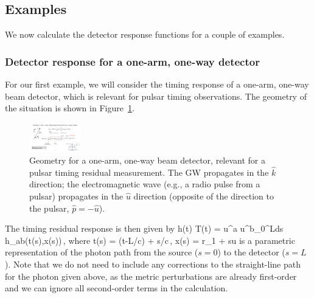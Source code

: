 \subsection{Examples}

We now calculate the detector response functions for a couple of
examples.

\subsubsection{Detector response for a one-arm, one-way detector}

For our first example, we will consider the timing response of a one-arm,
one-way beam detector, which is relevant for pulsar timing observations.
The geometry of the situation is shown in Figure~\ref{f:one_arm_one_way}.
%
\begin{figure}[htbp!]
\begin{center}
\includegraphics[width=0.2\textwidth]{Figures/one_arm_one_way}
\caption{Geometry for a one-arm, one-way beam detector, relevant for 
a pulsar timing residual measurement.
The GW propagates in the $\hat k$ direction; the electromagnetic wave
(e.g., a radio pulse from a pulsar) propagates in the $\hat u$ direction
(opposite of the direction to the pulsar, $\hat p=-\hat u$).} 
\label{f:one_arm_one_way}
\end{center}
\end{figure}
%
The timing residual response is then given by
\be
h(t)\equiv
\Delta T(t) =  u^a u^b\int_0^L{\rm d}s\> h_{ab}(t(s),\vec x(s))\,,
\ee
%
where
%
\be
t(s) = (t-L/c) + s/c\,, \qquad
\vec x(s) = \vec r_1 + s\hat u
\ee
%
is a parametric representation of the photon path from the 
source ($s=0$) to the detector ($s=L$).
Note that we do not need to include any corrections to
the straight-line path for the photon given above, as the 
metric perturbations are already first-order and we 
can ignore all second-order terms in the calculation.

